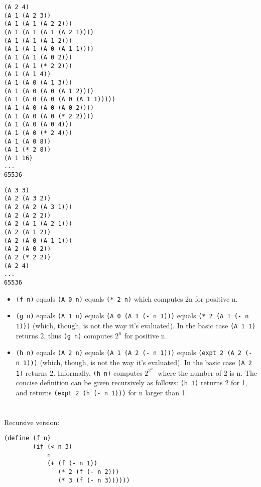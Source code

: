 \documentclass[a4paper]{report}
\begin{document}
\begin{lstlisting}
(A 2 4)
(A 1 (A 2 3))
(A 1 (A 1 (A 2 2)))
(A 1 (A 1 (A 1 (A 2 1))))
(A 1 (A 1 (A 1 2)))
(A 1 (A 1 (A 0 (A 1 1))))
(A 1 (A 1 (A 0 2)))
(A 1 (A 1 (* 2 2)))
(A 1 (A 1 4))
(A 1 (A 0 (A 1 3)))
(A 1 (A 0 (A 0 (A 1 2))))
(A 1 (A 0 (A 0 (A 0 (A 1 1)))))
(A 1 (A 0 (A 0 (A 0 2))))
(A 1 (A 0 (A 0 (* 2 2))))
(A 1 (A 0 (A 0 4)))
(A 1 (A 0 (* 2 4)))
(A 1 (A 0 8))
(A 1 (* 2 8))
(A 1 16)
...
65536
\end{lstlisting}

\begin{lstlisting}
(A 3 3)
(A 2 (A 3 2))
(A 2 (A 2 (A 3 1)))
(A 2 (A 2 2))
(A 2 (A 1 (A 2 1)))
(A 2 (A 1 2))
(A 2 (A 0 (A 1 1)))
(A 2 (A 0 2))
(A 2 (* 2 2))
(A 2 4)
...
65536
\end{lstlisting}

\begin{itemize}
\item \lstinline{(f n)} equals \lstinline{(A 0 n)} equals \lstinline{(* 2 n)} which computes 2n for positive n.
\item \lstinline{(g n)} equals \lstinline{(A 1 n)} equals \lstinline{(A 0 (A 1 (- n 1)))} equals \lstinline{(* 2 (A 1 (- n 1)))} (which, though, is not the way it's evaluated). In the basic case \lstinline{(A 1 1)} returns 2, thus \lstinline{(g n)} computes $2^n$ for positive n.
\item \lstinline{(h n)} equals \lstinline{(A 2 n)} equals \lstinline{(A 1 (A 2 (- n 1)))} equals \lstinline{(expt 2 (A 2 (- n 1)))} (which, though, is not the way it's evaluated). In the basic case \lstinline{(A 2 1)} returns 2. Informally, \lstinline{(h n)} computes $2^{2^{2^{...}}}$ where the number of 2 is n. The concise definition can be given recursively as follows: \lstinline{(h 1)} returns 2 for 1, and returns \lstinline{(expt 2 (h (- n 1)))} for n larger than 1.
\end{itemize}


\section{}

Recursive version:

\begin{lstlisting}
(define (f n)
        (if (< n 3)
            n
            (+ (f (- n 1))
               (* 2 (f (- n 2)))
               (* 3 (f (- n 3))))))
\end{lstlisting}
\end{document}
